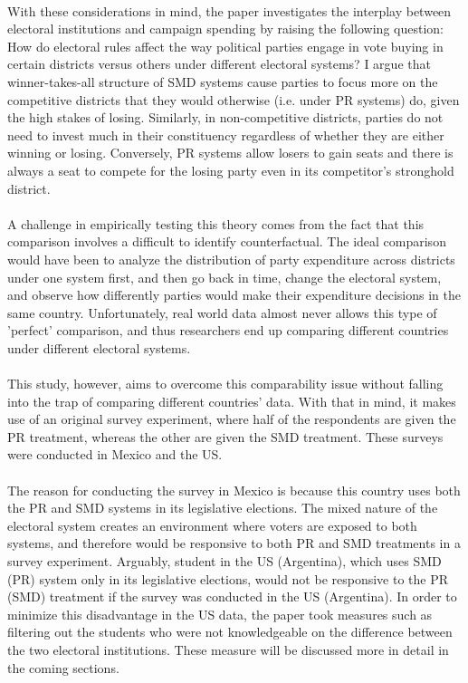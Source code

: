 \documentclass{article}
\begin{document}
\\
With these considerations in mind, the paper investigates the interplay between electoral institutions and campaign spending by raising the following question: How do electoral rules affect the way political parties engage in vote buying in certain districts versus others under different electoral systems? I argue that winner-takes-all structure of SMD systems cause parties to focus more on the competitive districts that they would otherwise (i.e. under PR systems) do, given the high stakes of losing. Similarly, in non-competitive districts, parties do not need to invest much in their constituency regardless of whether they are either winning or losing. Conversely, PR systems allow losers to gain seats and there is always a seat to compete for the losing party even in its competitor's stronghold district.\\
\\
A challenge in empirically testing this theory comes from the fact that this comparison involves a difficult to identify counterfactual. The ideal comparison would have been to analyze the distribution of party expenditure across districts under one system first, and then go back in time, change the electoral system, and observe how differently parties would make their expenditure decisions in the same country. Unfortunately, real world data almost never allows this type of 'perfect' comparison, and thus researchers end up comparing different countries under different electoral systems. \\
\\
This study, however, aims to overcome this comparability issue without falling into the trap of comparing different countries' data. With that in mind, it makes use of an original survey experiment, where half of the respondents are given the PR treatment, whereas the other are given the SMD treatment. These surveys were conducted in Mexico and the US. \\
\\
The reason for conducting the survey in Mexico is because this country uses both the PR and SMD systems in its legislative elections. The mixed nature of the electoral system creates an environment where voters are exposed to both systems, and therefore would be responsive to both PR and SMD treatments in a survey experiment. Arguably, student in the US (Argentina), which uses SMD (PR) system only in its legislative elections, would not be responsive to the PR (SMD) treatment if the survey was conducted in the US (Argentina). In order to minimize this disadvantage in the US data, the paper took measures such as filtering out the students who were not knowledgeable on the difference between the two electoral institutions. These measure will be discussed more in detail in the coming sections.
\end{document}
